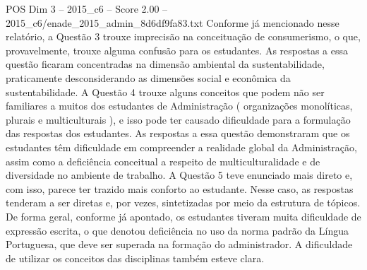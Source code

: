 \begin{textsample}{POS Dim 3 – 2015\_c6 – Score 2.00 – 2015\_c6/enade\_2015\_admin\_8d6df9fa83.txt}
Conforme já mencionado nesse relatório, a Questão 3 trouxe imprecisão na conceituação de consumerismo, o que, provavelmente, trouxe alguma confusão para os estudantes.
As respostas a essa questão ficaram concentradas na dimensão ambiental da sustentabilidade, praticamente desconsiderando as dimensões social e econômica da sustentabilidade.
A Questão 4 trouxe alguns conceitos que podem não ser familiares a muitos dos estudantes de Administração ( organizações monolíticas, plurais e multiculturais ), e isso pode ter causado dificuldade para a formulação das respostas dos estudantes.
As respostas a essa questão demonstraram que os estudantes têm dificuldade em compreender a realidade global da Administração, assim como a deficiência conceitual a respeito de multiculturalidade e de diversidade no ambiente de trabalho.
A Questão 5 teve enunciado mais direto e, com isso, parece ter trazido mais conforto ao estudante.
Nesse caso, as respostas tenderam a ser diretas e, por vezes, sintetizadas por meio da estrutura de tópicos.
De forma geral, conforme já apontado, os estudantes tiveram muita dificuldade de expressão escrita, o que denotou deficiência no uso da norma padrão da Língua Portuguesa, que deve ser superada na formação do administrador.
A dificuldade de utilizar os conceitos das disciplinas também esteve clara.

\end{textsample}
